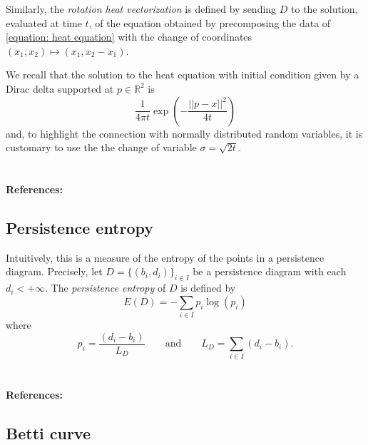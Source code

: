 \documentclass{amsart}
\begin{document}
	Similarly, the \textit{rotation heat vectorization} is defined by sending $D$ to the solution, evaluated at time $t$, of the equation obtained by precomposing the data of \eqref{equation: heat equation} with the change of coordinates $(x_1, x_2) \mapsto (x_1, x_2-x_1)$.
	
	We recall that the solution to the heat equation with initial condition given by a Dirac delta supported at $p \in \mathbb R^2$ is
	\begin{equation*}
	\frac{1}{4 \pi t} \exp\left(-\frac{||p-x||^2}{4t}\right)
	\end{equation*} 
	and, to highlight the connection with normally distributed random variables, it is customary to use the the change of variable $\sigma = \sqrt{2t}$.
	
	\paragraph{\\ References:} \cite{reininghaus2015stable,adams2017persistence}
	
	\subsection*{Persistence entropy} \label{persistence_entropy}
	
	Intuitively, this is a measure of the entropy of the points in a
	persistence diagram. Precisely, let $D = \{(b_i, d_i)\}_{i \in I}$ be a persistence diagram with each $d_i < +\infty$. The \textit{persistence entropy} of $D$ is defined by
	\begin{equation*}
	E(D) = - \sum_{i \in I} p_i \log(p_i)
	\end{equation*}
	where
	\begin{equation*}
	p_i = \frac{(d_i - b_i)}{L_D} \qquad \text{and} \qquad L_D = \sum_{i \in I} (d_i - b_i) . 
	\end{equation*}
	
	\paragraph{\\ References:} \cite{rucco2016characterisation}
	
	\subsection*{Betti curve} \label{betti_curve}
	
\end{document}
